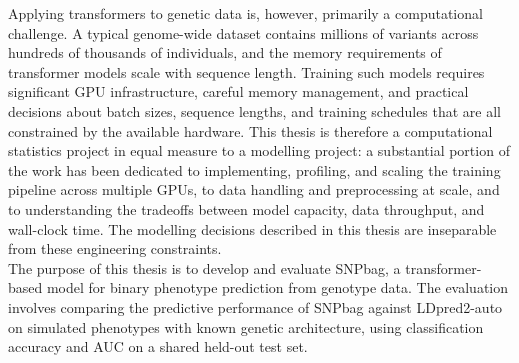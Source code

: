Applying transformers to genetic data is, however, primarily a
computational challenge. A typical genome-wide dataset contains millions
of variants across hundreds of thousands of individuals, and the memory
requirements of transformer models scale with sequence length. Training
such models requires significant GPU infrastructure, careful memory
management, and practical decisions about batch sizes, sequence lengths,
and training schedules that are all constrained by the available
hardware. This thesis is therefore a computational statistics project in
equal measure to a modelling project: a substantial portion of the work
has been dedicated to implementing, profiling, and scaling the training
pipeline across multiple GPUs, to data handling and preprocessing at
scale, and to understanding the tradeoffs between model capacity, data
throughput, and wall-clock time. The modelling decisions described in
this thesis are inseparable from these engineering constraints.\\

The purpose of this thesis is to develop and evaluate SNPbag, a
transformer-based model for binary phenotype prediction from genotype
data. The evaluation involves comparing the predictive performance of
SNPbag against LDpred2-auto \citep{Prive2023} on simulated phenotypes
with known genetic architecture, using classification accuracy and AUC
on a shared held-out test set.